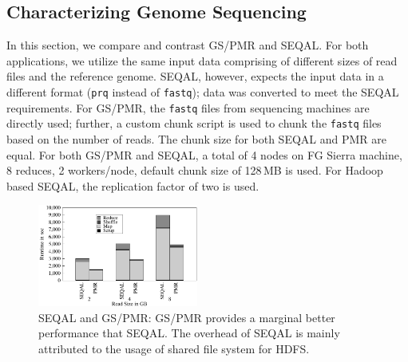 \documentclass{sig-alternate}
\newcommand{\jhanote}[1]{ {\textcolor{red} { ***SJ: #1 }}}
\newcommand{\alnote}[1]{ {\textcolor{blue} { ***andreL: #1 }}}
\newcommand{\pnote}[1]{ {\textcolor{magenta} { ***pradeep: #1 }}}
\newcommand{\alnote}[1]{}
\newcommand{\pnote}[1]{}
\newcommand{\jhanote}[1]{}
\newcommand{\upp}{\vspace*{-0.5em}}
\begin{document}

\upp\upp
\subsection{Characterizing Genome Sequencing}

In this section, we compare and contrast GS/PMR and SEQAL. For both
applications, we utilize the same input data comprising of different
sizes of read files and the reference genome. SEQAL, however, expects
the input data in a different format (\texttt{prq} instead of
\texttt{fastq}); data was converted to meet the SEQAL
requirements. For GS/PMR, the \texttt{fastq}
files from sequencing machines are directly used; further, a custom
chunk script is used to chunk the \texttt{fastq} files based on the number of
reads. The chunk size for both SEQAL and PMR are equal. For both
GS/PMR and SEQAL, a total of 4 nodes on FG Sierra machine, 8
reduces, 2 workers/node, default chunk size of 128\,MB is used. For
Hadoop based SEQAL, the replication factor of two is used.  


\begin{figure}[ht]
	\centering
		\includegraphics[width=0.47\textwidth]{figures/gs_seq_pmr.pdf}
\caption{SEQAL and GS/PMR: GS/PMR provides a marginal better
  performance that SEQAL. The overhead of SEQAL is mainly attributed
  to the usage of shared file system for HDFS.\upp}
\label{fig:gs_seq_pmr}
\end{figure}		
\end{document}
